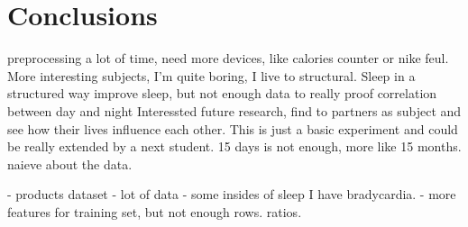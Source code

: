 \section{Conclusions}
	preprocessing a lot of time, 
	need more devices, like calories counter or nike feul.
	More interesting subjects, I'm quite boring, I live to structural.
	Sleep in a structured way improve sleep, 
		but not enough data to really proof correlation between day and night
	Interessted future research, find to partners as subject and see how their lives influence each other.
	This is just a basic experiment and could be really extended by a next student.
	15 days is not enough, more like 15 months. 
	naieve about the data. 


	- products dataset
	- lot of data
	-  some insides of sleep
	I have bradycardia. 
	- more features for training set, but not enough rows. ratios.
